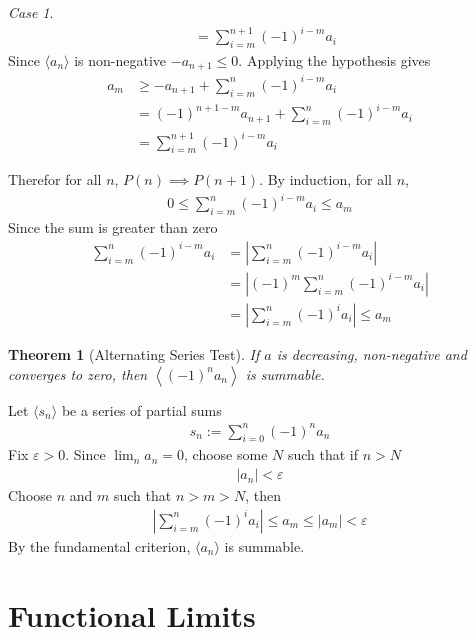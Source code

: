\documentclass{amsart}
\numberwithin{equation}{section}
\let\oldendproof\endproof
\renewenvironment{proof}[1][\proofname]{%
  \setcounter{case}{0}
  \setcounter{step}{0}
  \oldproof[#1]%
}{\oldendproof}
\theoremstyle{plain}
\newtheorem{theorem}{Theorem}[section]
\theoremstyle{definition}
\theoremstyle{remark}
\newtheorem{case}{Case}
\begin{document}
\begin{proof}
\begin{case}
\begin{align}
      &= \sum^{n+1}_{i=m} (-1)^{i-m} a_i
    \end{align}
    Since $\langle a_n \rangle$ is non-negative $-a_{n+1} \leq 0$. Applying the hypothesis gives
    \begin{align}
      a_m &\geq -a_{n+1} + \sum^n_{i=m} (-1)^{i-m} a_i \\
      &=(-1)^{n+1-m} a_{n+1} + \sum^n_{i=m} (-1)^{i-m}a_i \\
      &=\sum^{n+1}_{i=m} (-1)^{i-m} a_i
    \end{align}
  \end{case}
  Therefor for all $n$, $P(n)\implies P(n+1)$. By induction, for all $n$,
  \begin{align}
    0 \leq \sum^n_{i=m} (-1)^{i-m}a_i \leq a_m
  \end{align}
  Since the sum is greater than zero
  \begin{align}
    \sum^n_{i=m} (-1)^{i-m}a_i &= \left|\sum^n_{i=m} (-1)^{i-m}a_i \right|\\
    &=\left|(-1)^m \sum^n_{i=m} (-1)^{i-m}a_i \right|\\
    &=\left| \sum^n_{i=m} (-1)^{i}a_i \right| \leq a_m
  \end{align}
\end{proof}

\begin{theorem}[Alternating Series Test]
  If $a$ is decreasing, non-negative and converges to zero, then $\left\langle (-1)^n a_n \right\rangle$ is summable.
\end{theorem}
\begin{proof}
  Let $\langle s_n \rangle$ be a series of partial sums
  \begin{align}
    s_n:= \sum^n_{i=0} (-1)^n a_n
  \end{align}
  Fix $\varepsilon>0$. Since $\lim_n a_n =0$, choose some $N$ such that if $n>N$
  \begin{align}
    |a_n| < \varepsilon
  \end{align}
  Choose $n$ and $m$ such that $n>m>N$, then
  \begin{align}
    \left| \sum_{i=m}^n (-1)^i a_i \right| \leq a_{m} \leq |a_{m} | < \varepsilon
  \end{align}
  By the fundamental criterion, $\langle a_n \rangle$ is summable.
\end{proof}


\section{Functional Limits}
\end{document}
